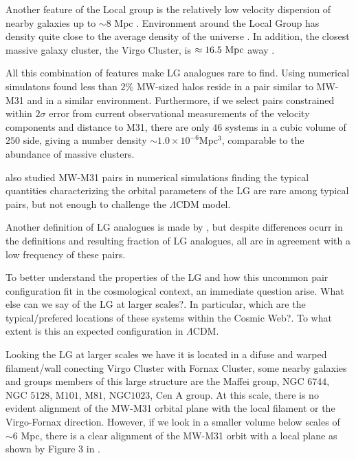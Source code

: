 \documentclass{emulateapj}
\newcommand{\lcdm}{$\Lambda$CDM }
\newcommand{\mpc}{\rm{Mpc}}
\newcommand{\hmpc}{{\ifmmode{h^{-1}{\rm Mpc}}\else{$h^{-1}$Mpc }\fi}}
\begin{document}
Another feature of the Local group is the relatively low velocity
dispersion of nearby galaxies up to $\sim 8$ Mpc \citep[][and
  references therein]{1975ApJ...196..313S,2011MNRAS.415L..16A}. 
Environment around the Local Group has density quite close to the
average density of the universe
\citep{2003ApJ...596...19K,2005AJ....129..178K}. 
In addition, the
closest massive galaxy cluster, the Virgo Cluster, is $\approx
16.5\ \mpc$ away \citep{2007ApJ...655..144M}.  

All this combination of features make LG analogues rare to
find. 
Using numerical simulatons \citet{lganalogues} found less than
$2\%$ MW-sized halos reside in a pair similar to MW-M31 and in a
similar environment. 
Furthermore, if we select pairs constrained
within $2\sigma$ error from current observational measurements of the
velocity components and distance to M31, there are only $46$ systems
in a cubic volume of $250$ \hmpc side, giving a number density $\sim
1.0\times 10^{-6}$Mpc$^{3}$, comparable to the abundance of massive
clusters.

\citet{2013ApJ...767L...5F} also studied MW-M31 pairs in numerical
simulations finding the typical quantities characterizing the orbital
parameters of the LG are rare among typical pairs, but not enough to
challenge the \lcdm model. 

Another definition of LG analogues is made by
\citet{2008MNRAS.384.1459L}, but despite differences ocurr in the
definitions and resulting fraction of LG analogues, all are in
agreement with a low frequency of these pairs. 

To better understand the properties of the LG and how this uncommon
pair configuration fit in the cosmological context, an immediate
question arise. What else can we say of the LG at larger scales?. In
particular, which are the typical/prefered locations of these systems
within the Cosmic Web?. To what extent is this an expected
configuration in $\Lambda$CDM.

Looking the LG at larger scales we have it is located in a difuse and
warped filament/wall conecting Virgo Cluster with Fornax Cluster, some
nearby galaxies and groups members of this large structure are the
Maffei group, NGC $6744$, NGC $5128$, M$101$, M$81$, NGC$1023$, Cen A
group. At this scale, there is no evident alignment of the MW-M31
orbital plane with the local filament or the Virgo-Fornax
direction. However, if we look in a smaller volume below scales of
$\sim 6$ \mpc, there is a clear alignment of the MW-M31 orbit with
a local plane as shown by Figure $3$ in \citet{2013AJ....146...69C}.  
\end{document}
